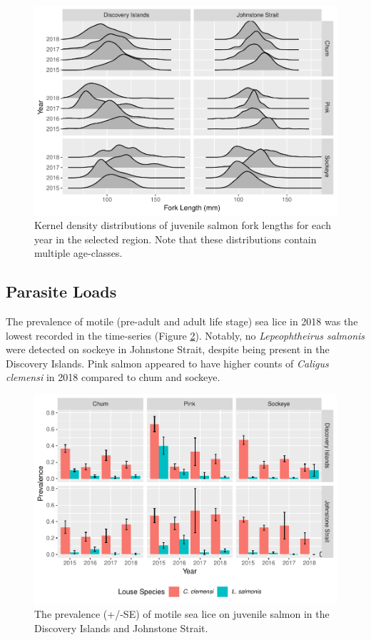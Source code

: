 \documentclass[fleqn,10pt]{wlpeerj} %
\begin{document}
\begin{figure}
\includegraphics[width=0.8\linewidth]{peer_j_migration_dynamics_files/figure-latex/length-1} \caption{Kernel density distributions of juvenile salmon fork lengths for each year in the selected region. Note that these distributions contain multiple age-classes.}\label{fig:length}
\end{figure}

\subsection*{Parasite Loads}\label{parasite-loads}

The prevalence of motile (pre-adult and adult life stage) sea lice in
2018 was the lowest recorded in the time-series (Figure
\ref{fig:sealice}). Notably, no \emph{Lepeophtheirus salmonis} were
detected on sockeye in Johnstone Strait, despite being present in the
Discovery Islands. Pink salmon appeared to have higher counts of
\emph{Caligus clemensi} in 2018 compared to chum and sockeye.

\begin{figure}
\includegraphics[width=0.8\linewidth]{peer_j_migration_dynamics_files/figure-latex/sealice-1} \caption{The prevalence (+/-SE) of motile sea lice on juvenile salmon in the Discovery Islands and Johnstone Strait.}\label{fig:sealice}
\end{figure}
\end{document}
